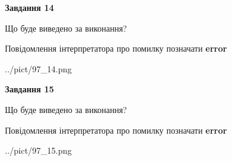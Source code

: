 \documentclass[11pt, ukrainian]{article}
\begin{document}
{\begin {large}
{\begin {center}\textbf{Завдання 14}\end {center}}\par
Що буде виведено за виконання? \par
Повідомлення інтерпретатора про помилку позначати \textbf{error}

\begin{center}
	{../pict/97_14.png}
\end{center}
\newpage

{\begin {center}\textbf{Завдання 15}\end {center}}\par
Що буде виведено за виконання? \par
Повідомлення інтерпретатора про помилку позначати \textbf{error}

\begin{center}
	{../pict/97_15.png}
\end{center}
\newpage

\end {large}}
\end{document}

